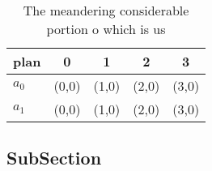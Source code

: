\documentclass[a4paper]{article}
\begin{document}
\begin{table}
\begin{adjustbox}{width=0.7\columnwidth}
\begin{tabular}{|l|l|l|l|l|}
\hline
\textbf{plan} & \multicolumn{1}{c|}{\textbf{0}} & \multicolumn{1}{c|}{\textbf{1}} & \multicolumn{1}{c|}{\textbf{2}} & \multicolumn{1}{c|}{\textbf{3}} \\ \hline
\textbf{$a_0$}  & (0,0) & (1,0) & (2,0) & (3,0) \\ \hline
\textbf{$a_1$}  & (0,0) & (1,0) & (2,0) & (3,0) \\ \hline
\end{tabular}
\end{adjustbox}
\caption{The meandering considerable portion o which is us
}
\end{table}

\subsection{SubSection}
\end{document}
